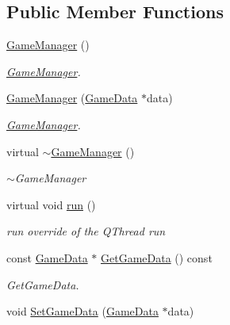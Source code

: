 \subsection*{Public Member Functions}
\begin{DoxyCompactItemize}
\item 
\hypertarget{classGameManager_aa0e2424dc1a39d380e5b6605b179bf05}{\hyperlink{classGameManager_aa0e2424dc1a39d380e5b6605b179bf05}{Game\-Manager} ()}\label{classGameManager_aa0e2424dc1a39d380e5b6605b179bf05}

\begin{DoxyCompactList}\small\item\em \hyperlink{classGameManager}{Game\-Manager}. \end{DoxyCompactList}\item 
\hyperlink{classGameManager_a80046eb2f443289f0ba1b3fa1272470a}{Game\-Manager} (\hyperlink{classGameData}{Game\-Data} $\ast$data)
\begin{DoxyCompactList}\small\item\em \hyperlink{classGameManager}{Game\-Manager}. \end{DoxyCompactList}\item 
\hypertarget{classGameManager_aaae63e38e358379c1fe507c5197a8435}{virtual \hyperlink{classGameManager_aaae63e38e358379c1fe507c5197a8435}{$\sim$\-Game\-Manager} ()}\label{classGameManager_aaae63e38e358379c1fe507c5197a8435}

\begin{DoxyCompactList}\small\item\em $\sim$\-Game\-Manager \end{DoxyCompactList}\item 
\hypertarget{classGameManager_abbde8090c24ca199815ba1e85059c96f}{virtual void \hyperlink{classGameManager_abbde8090c24ca199815ba1e85059c96f}{run} ()}\label{classGameManager_abbde8090c24ca199815ba1e85059c96f}

\begin{DoxyCompactList}\small\item\em run override of the Q\-Thread run \end{DoxyCompactList}\item 
const \hyperlink{classGameData}{Game\-Data} $\ast$ \hyperlink{classGameManager_ae6075cdc12a4b98aeddc4cda20854393}{Get\-Game\-Data} () const 
\begin{DoxyCompactList}\small\item\em Get\-Game\-Data. \end{DoxyCompactList}\item 
\hypertarget{classGameManager_a760b12229d3d010a81507a07760a4315}{void \hyperlink{classGameManager_a760b12229d3d010a81507a07760a4315}{Set\-Game\-Data} (\hyperlink{classGameData}{Game\-Data} $\ast$data)}\label{classGameManager_a760b12229d3d010a81507a07760a4315}


\end{DoxyCompactItemize}

